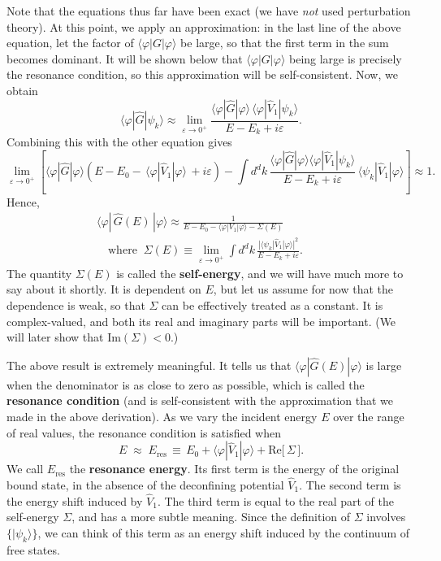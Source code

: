 \documentclass[pra,12pt]{revtex4}
\begin{document}
Note that the equations thus far have been exact (we have \textit{not}
used perturbation theory).  At this point, we apply an approximation:
in the last line of the above equation, let the factor of
$\langle\varphi|G|\varphi\rangle$ be large, so that the first term in
the sum becomes dominant.  It will be shown below that
$\langle\varphi|G|\varphi\rangle$ being large is precisely the
resonance condition, so this approximation will be self-consistent.
Now, we obtain
\begin{equation}
  \langle\varphi|\hat{G}|\psi_k\rangle \approx \lim_{\varepsilon\rightarrow0^+} \frac{\langle\varphi|\hat{G}|\varphi\rangle \, \langle\varphi|\hat{V}_1|\psi_k\rangle}{E-E_k+i\varepsilon}.
\end{equation}
Combining this with the other equation gives
\begin{equation}
  \lim_{\varepsilon\rightarrow0^+} \left[\langle\varphi|\hat{G}|\varphi\rangle \left(E - E_0 -\, \langle\varphi|\hat{V}_1|\varphi\rangle \, + i\varepsilon\right) - \int d^dk\, \frac{\langle\varphi|\hat{G}|\varphi\rangle\langle\varphi|\hat{V}_1|\psi_k\rangle}{E-E_k+i\varepsilon} \, \langle\psi_k| \hat{V}_1|\varphi\rangle\right] \approx 1.
\end{equation}
Hence,
$$\boxed{\begin{aligned}\langle\varphi|\,\hat{G}(E)\,|\varphi\rangle \approx \frac{1}{\displaystyle E - E_0 - \langle\varphi|V_1|\varphi\rangle - \Sigma(E)} \qquad \\ \quad \mathrm{where}\;\;\Sigma(E) \equiv \lim_{\varepsilon\rightarrow0^+} \int d^dk\, \frac{\displaystyle| \langle\psi_k| \hat{V}_1|\varphi\rangle|^2}{\displaystyle E-E_k+i\varepsilon}. \qquad
\end{aligned}}$$
The quantity $\Sigma(E)$ is called the \textbf{self-energy}, and we
will have much more to say about it shortly.  It is dependent on $E$,
but let us assume for now that the dependence is weak, so that
$\Sigma$ can be effectively treated as a constant.  It is
complex-valued, and both its real and imaginary parts will be
important.  (We will later show that $\mathrm{Im}(\Sigma) < 0$.)

The above result is extremely meaningful.  It tells us that
$\langle\varphi|\hat{G}(E)|\varphi\rangle$ is large when the
denominator is as close to zero as possible, which is called the
\textbf{resonance condition} (and is self-consistent with the
approximation that we made in the above derivation).  As we vary the
incident energy $E$ over the range of real values, the resonance
condition is satisfied when
\begin{equation}
  E \;\approx\; E_{\mathrm{res}} \,\equiv\, E_0 + \langle\varphi|\hat{V}_1|\varphi\rangle + \mathrm{Re}\big[\,\Sigma\,\big].
\end{equation}
We call $E_{\mathrm{res}}$ the \textbf{resonance energy}.  Its first
term is the energy of the original bound state, in the absence of the
deconfining potential $\hat{V}_1$.  The second term is the energy
shift induced by $\hat{V}_1$.  The third term is equal to the real
part of the self-energy $\Sigma$, and has a more subtle meaning.
Since the definition of $\Sigma$ involves $\{|\psi_k\rangle\}$, we can
think of this term as an energy shift induced by the continuum of free
states.
\end{document}
